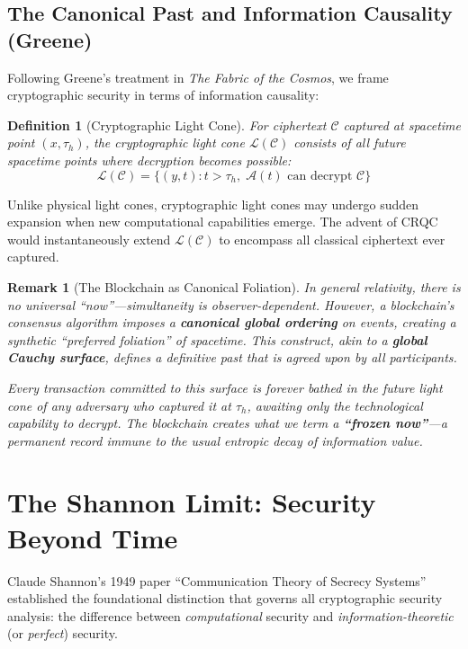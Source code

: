 \documentclass[11pt,a4paper]{article}
\newtheorem{definition}[theorem]{Definition}
\newtheorem{remark}[theorem]{Remark}
\begin{document}
\subsection{The Canonical Past and Information Causality (Greene)}

Following Greene's treatment in \textit{The Fabric of the Cosmos}, we frame cryptographic security in terms of information causality:

\begin{definition}[Cryptographic Light Cone]
For ciphertext $\mathcal{C}$ captured at spacetime point $(x, \tau_h)$, the \textit{cryptographic light cone} $\mathcal{L}(\mathcal{C})$ consists of all future spacetime points where decryption becomes possible:
\begin{equation}
\mathcal{L}(\mathcal{C}) = \{(y, t) : t > \tau_h, \; \mathcal{A}(t) \text{ can decrypt } \mathcal{C}\}
\end{equation}
\end{definition}

Unlike physical light cones, cryptographic light cones may undergo sudden expansion when new computational capabilities emerge. The advent of CRQC would instantaneously extend $\mathcal{L}(\mathcal{C})$ to encompass all classical ciphertext ever captured.

\begin{remark}[The Blockchain as Canonical Foliation]
In general relativity, there is no universal ``now''---simultaneity is observer-dependent. However, a blockchain's consensus algorithm imposes a \textbf{canonical global ordering} on events, creating a synthetic ``preferred foliation'' of spacetime. This construct, akin to a \textbf{global Cauchy surface}, defines a definitive past that is agreed upon by all participants.

Every transaction committed to this surface is forever bathed in the future light cone of any adversary who captured it at $\tau_h$, awaiting only the technological capability to decrypt. The blockchain creates what we term a \textbf{``frozen now''}---a permanent record immune to the usual entropic decay of information value.
\end{remark}

\section{The Shannon Limit: Security Beyond Time}

Claude Shannon's 1949 paper ``Communication Theory of Secrecy Systems'' established the foundational distinction that governs all cryptographic security analysis: the difference between \textit{computational} security and \textit{information-theoretic} (or \textit{perfect}) security.
\end{document}
